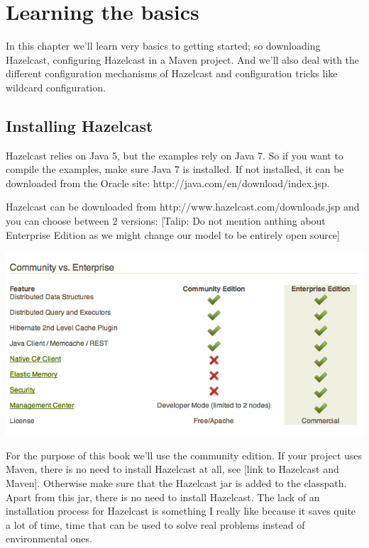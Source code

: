 \chapter{Learning the basics}
In this chapter we'll learn very basics to getting started; so downloading Hazelcast, configuring Hazelcast in a Maven project. And we'll also deal with the different configuration mechanisms of Hazelcast and configuration tricks like wildcard configuration.

\section{Installing Hazelcast}
Hazelcast relies on Java 5, but the examples rely on Java 7. So if you want to compile the examples, make sure Java 7 is installed. If not installed, it can be downloaded from the Oracle site: http://java.com/en/download/index.jsp.

Hazelcast can be downloaded from http://www.hazelcast.com/downloads.jsp and you can choose between 2 versions:
[Talip: Do not mention anthing about Enterprise Edition as we might change our model to be entirely open source]

\includegraphics[scale=0.60]{hazelcast-editions.png}

For the purpose of this book we'll use the community edition. If your project uses Maven, there is no need to install Hazelcast at all, see [link to Hazelcast and Maven]. Otherwise make sure that the Hazelcast jar is added to the classpath. Apart from this jar, there is no need to install Hazelcast.  The lack of an installation process for Hazelcast is something I really like because it saves quite a lot of time, time that can be used to solve real problems instead of environmental ones.

